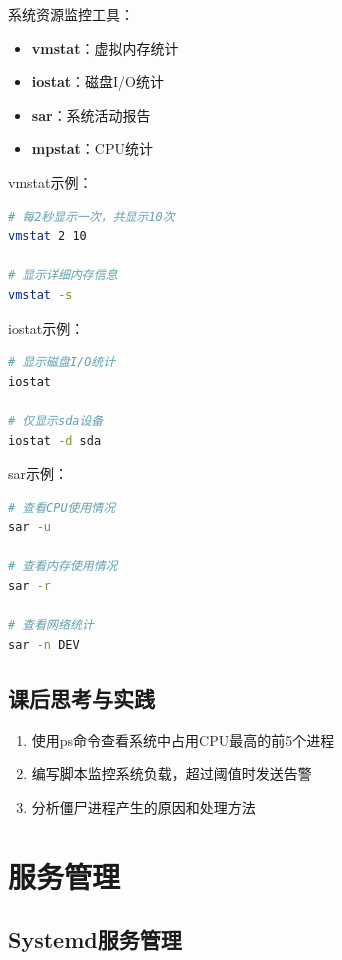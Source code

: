 \documentclass[12pt,UTF8]{ctexbook}
\begin{document}
系统资源监控工具：

\begin{itemize}
    \item \textbf{vmstat}：虚拟内存统计
    \item \textbf{iostat}：磁盘I/O统计
    \item \textbf{sar}：系统活动报告
    \item \textbf{mpstat}：CPU统计
\end{itemize}

vmstat示例：
\begin{lstlisting}[language=bash]
# 每2秒显示一次，共显示10次
vmstat 2 10

# 显示详细内存信息
vmstat -s
\end{lstlisting}

iostat示例：
\begin{lstlisting}[language=bash]
# 显示磁盘I/O统计
iostat

# 仅显示sda设备
iostat -d sda
\end{lstlisting}

sar示例：
\begin{lstlisting}[language=bash]
# 查看CPU使用情况
sar -u

# 查看内存使用情况
sar -r

# 查看网络统计
sar -n DEV
\end{lstlisting}

\section{课后思考与实践}
\label{sec:process-practice}
\begin{enumerate}
    \item 使用ps命令查看系统中占用CPU最高的前5个进程
    \item 编写脚本监控系统负载，超过阈值时发送告警
    \item 分析僵尸进程产生的原因和处理方法
\end{enumerate}

\chapter{服务管理}
\label{chap:service-management}

\section{Systemd服务管理}
\label{sec:systemd}
\end{document}
